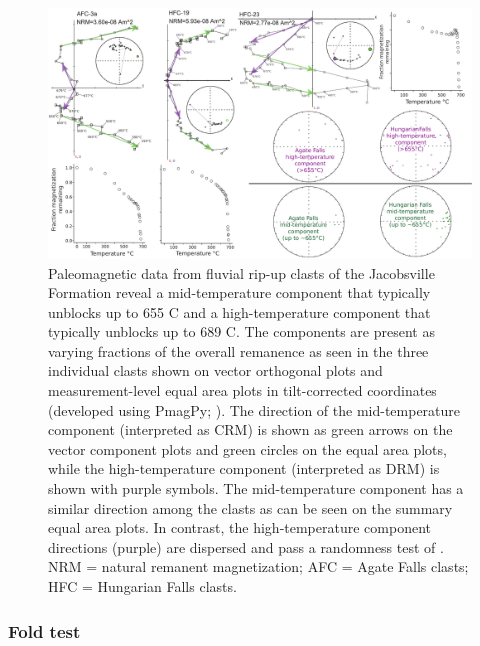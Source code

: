 \documentclass[draft]{agujournal2019}
\begin{document}
\begin{figure}[h!]
\centering
\includegraphics[width=\textwidth]{intraclast_pmag.pdf}
\caption{Paleomagnetic data from fluvial rip-up clasts of the Jacobsville Formation reveal a mid-temperature component that typically unblocks up to 655 \textdegree C and a high-temperature component that typically unblocks up to 689 \textdegree C. The components are present as varying fractions of the overall remanence as seen in the three individual clasts shown on vector orthogonal plots and measurement-level equal area plots in tilt-corrected coordinates (developed using PmagPy; ). The direction of the mid-temperature component (interpreted as CRM) is shown as green arrows on the vector component plots and green circles on the equal area plots, while the high-temperature component (interpreted as DRM) is shown with purple symbols. The mid-temperature component has a similar direction among the clasts as can be seen on the summary equal area plots. In contrast, the high-temperature component directions (purple) are dispersed and pass a randomness test of . NRM = natural remanent magnetization; AFC = Agate Falls clasts; HFC = Hungarian Falls clasts.}
\label{fig:intraclast_pmag}
\end{figure}

\subsubsection*{Fold test}
\end{document}

